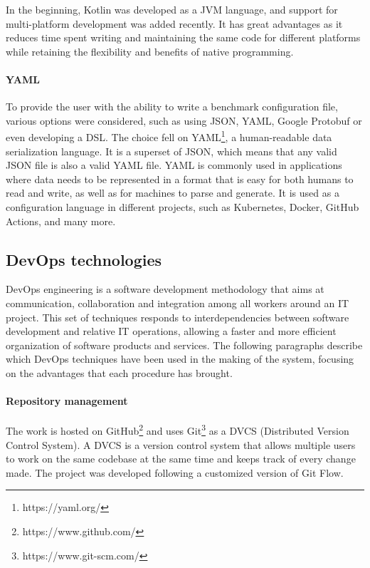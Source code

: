 \documentclass[12pt,a4paper,openright,twoside]{book}
\begin{document}
In the beginning, Kotlin was developed as a JVM language, and support for multi-platform development was added recently. 
It has great advantages as it reduces time spent writing and maintaining the same code for different platforms while retaining the flexibility and benefits of native programming.

\paragraph*{YAML}
To provide the user with the ability to write a benchmark configuration file, various options were considered, such as using JSON, YAML, Google Protobuf or even developing a DSL. 
The choice fell on YAML\footnote{https://yaml.org/}, a human-readable data serialization language. It is a superset of JSON, which means that any valid JSON file is also a valid YAML file.
YAML is commonly used in applications where data needs to be represented in a format that is easy for both humans to read and write, as well as for machines to parse and generate.
It is used as a configuration language in different projects, such as Kubernetes, Docker, GitHub Actions, and many more.

\subsection*{DevOps technologies}
DevOps engineering is a software development methodology that aims at communication, collaboration and integration among all workers around an IT project. 
This set of techniques responds to interdependencies between software development and relative IT operations, allowing a faster and more efficient organization of software products and services.
The following paragraphs describe which DevOps techniques have been used in the making of the system, focusing on the advantages that each procedure has brought.

\paragraph*{Repository management}
The work is hosted on GitHub\footnote{https://www.github.com/} and uses Git\footnote{https://www.git-scm.com/} as a DVCS (Distributed Version Control System).
A DVCS is a version control system that allows multiple users to work on the same codebase at the same time and keeps track of every change made.
The project was developed following a customized version of Git Flow. 
\end{document}
